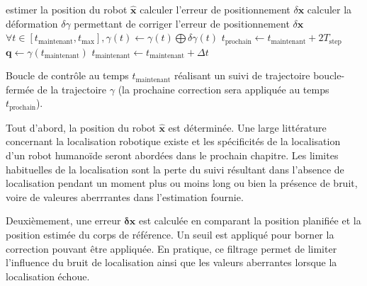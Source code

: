\begin{algorithm}
  \begin{algorithmic}
    \STATE estimer la position du robot $\mathbf{\hat{x}}$
    \STATE calculer l'erreur de positionnement $\delta \mathbf{x}$
    \STATE calculer la déformation $\delta \gamma$ permettant de
    corriger l'erreur de positionnement $\delta \mathbf{x}$
    \STATE $\forall t \in [t_{\text{maintenant}}, t_{\text{max}}],
    \gamma(t) \leftarrow \gamma(t) \bigoplus \delta \gamma(t)$
    \STATE $t_{\text{prochain}} \leftarrow t_{\text{maintenant}} + 2 T_{\text{step}}$
    \ENDIF
    \ENDIF
    \STATE $\mathbf{q} \leftarrow \gamma(t_{\text{maintenant}})$
    \STATE $t_{\text{maintenant}} \leftarrow t_{\text{maintenant}} + \Delta t$
  \end{algorithmic}
  \caption{Boucle de contrôle au temps $t_{\text{maintenant}}$ réalisant
    un suivi de trajectoire boucle-fermée de la trajectoire $\gamma$
    (la prochaine correction sera appliquée au temps
    $t_{\text{prochain}}$). \label{fig:control_loop}}
\end{algorithm}

Tout d'abord, la position du robot $\hat{\mathbf{x}}$ est
déterminée. Une large littérature concernant la localisation robotique
existe \cite{08ijhr.stasse, 06humanoids.thompson} et les spécificités
de la localisation d'un robot humanoïde seront abordées dans le
prochain chapitre. Les limites habituelles de la localisation sont la
perte du suivi résultant dans l'absence de localisation pendant un
moment plus ou moins long ou bien la présence de bruit, voire de
valeures aberrrantes dans l'estimation fournie.

Deuxièmement, une erreur $\mathbf{\delta \mathbf{x}}$ est calculée en
comparant la position planifiée et la position estimée du corps de
référence. Un seuil est appliqué pour borner la correction pouvant
être appliquée. En pratique, ce filtrage permet de limiter l'influence
du bruit de localisation ainsi que les valeurs aberrantes lorsque la
localisation échoue.


